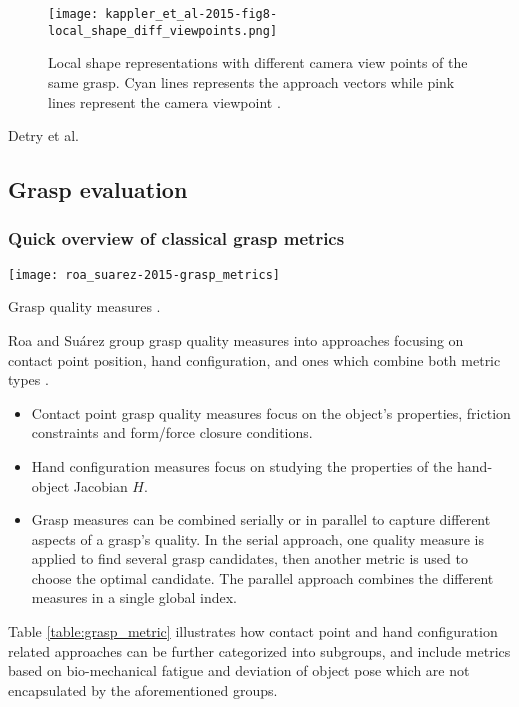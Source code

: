 \begin{figure}[H]
    \centering
    \texttt{[image: kappler\_et\_al-2015-fig8-local\_shape\_diff\_viewpoints.png]}
    \caption{Local shape representations with different camera view points of the same grasp. Cyan lines
        represents the approach vectors while pink lines represent the camera viewpoint \cite{Kappler2015}.}
    \label{fig:local_shape_viewpoints}
\end{figure}

Detry et al. \cite{Detry2012} 

\subsection{Grasp evaluation}

\subsubsection*{Quick overview of classical grasp metrics}
\begin{table}[H]
    \texttt{[image: roa\_suarez-2015-grasp\_metrics]}
    \caption{Grasp quality measures \cite{Roa2015}.}
    \label{table:grasp_metric}
\end{table}

Roa and Su{\'a}rez group grasp quality measures into approaches focusing on contact point position, hand configuration, and ones which combine both metric types \cite{Roa2015}.
\begin{itemize}
    \item Contact point grasp quality measures focus on the object's properties, friction constraints and form/force closure conditions.
    \item Hand configuration measures focus on studying the properties of the hand-object Jacobian $H$.
    \item Grasp measures can be combined serially or in parallel to capture different aspects of a grasp's quality. In the serial approach, one quality measure is applied to find several grasp candidates, then another metric is used to choose the optimal candidate. The parallel approach combines the different measures in a single global index.
\end{itemize}
Table \ref{table:grasp_metric} illustrates how contact point and hand configuration related approaches can be further categorized into subgroups, and include metrics based on bio-mechanical fatigue and deviation of object pose which are not encapsulated by the aforementioned groups.

